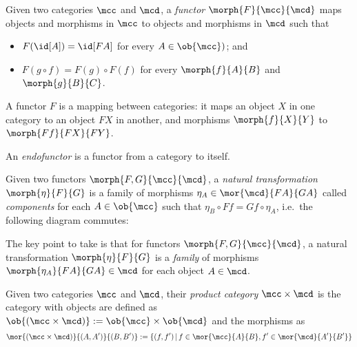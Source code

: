 \begin{definition}[Functor]
    Given two categories \(\mcc\) and \(\mcd\), a \emph{functor} \(
        \morph{F}{\mcc}{\mcd}
    \) maps objects and morphisms in \(\mcc\) to objects and morphisms in
    \(\mcd\) such that
    \begin{itemize}
        \item \(F(\id[A]) = \id[FA]\) for every \(A \in \ob{\mcc})\); and
        \item \(F(g \circ f) = F(g) \circ F(f)\) for every \(\morph{f}{A}{B}\)
        and \(\morph{g}{B}{C}\).
    \end{itemize}
\end{definition}

A functor \(F\) is a mapping between categories: it maps an object \(X\) in one
category to an object \(FX\) in another, and morphisms \(\morph{f}{X}{Y}\) to
\(\morph{Ff}{FX}{FY}\).

\begin{definition}[Endofunctor]
    An \emph{endofunctor} is a functor from a category to itself.
\end{definition}

\begin{definition}
    Given two functors \(\morph{F, G}{\mcc}{\mcd}\), a
    \emph{natural transformation} \(\morph{\eta}{F}{G}\) is a family of
    morphisms \(
        \eta_A \in \mor{\mcd}{FA}{GA}
    \) called \emph{components} for each \(A \in \ob{\mcc}\) such that \(
        \eta_B \circ Ff = Gf \circ \eta_A
    \), i.e.\ the following diagram commutes:
    \begin{center}
        
    \end{center}
\end{definition}

The key point to take is that for functors \(\morph{F,G}{\mcc}{\mcd}\), a
natural transformation \(\morph{\eta}{F}{G}\) is a \emph{family} of morphisms
\(\morph{\eta_A}{FA}{GA} \in \mcd\) for each object \(A \in \mcd\).



\begin{definition}
    Given two categories \(\mcc\) and \(\mcd\), their \emph{product category}
    \(\mcc \times \mcd\) is the category with objects are defined as \(
        \ob{(\mcc \times \mcd)} := \ob{\mcc} \times \ob{\mcd}
    \) and the morphisms as \[
        \mor{(\mcc \times \mcd)}{(A, A^\prime)}{(B, B^\prime)}
        :=
        \{
            (f, f^\prime)
            \,|\,
            f \in \mor{\mcc}{A}{B},
            f^\prime \in \mor{\mcd}{A^\prime}{B^\prime}
        \}
    \]
\end{definition}

